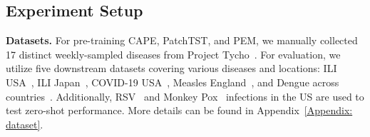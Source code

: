 \subsection{Experiment Setup}
\noindent\textbf{Datasets.} For pre-training CAPE, PatchTST, and PEM, we manually collected 17 distinct weekly-sampled diseases from Project Tycho~\cite{van2018project}. For evaluation, we utilize five downstream datasets covering various diseases and locations: ILI USA~\cite{cdc_ili_usa}, ILI Japan~\cite{cdc_ili_japan}, COVID-19 USA~\cite{dong2020interactive}, Measles England~\cite{lau2020competing}, and Dengue across countries~\cite{opendengue}. Additionally, RSV~\cite{cdc_rsv} and Monkey Pox~\cite{cdc_monkeypox} infections in the US are used to test zero-shot performance. More details can be found in Appendix~\ref{Appendix: dataset}. 


